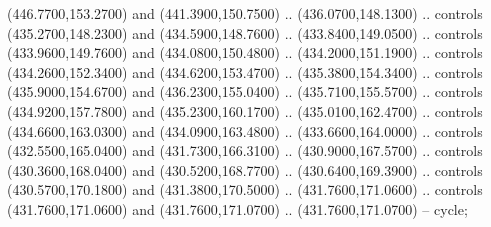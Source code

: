{\begin{scope}[y=0.80pt, x=0.80pt, yscale=-1, xscale=1, inner sep=0pt, outer sep=0pt, #1]
      (446.7700,153.2700) and (441.3900,150.7500) .. (436.0700,148.1300) .. controls
      (435.2700,148.2300) and (434.5900,148.7600) .. (433.8400,149.0500) .. controls
      (433.9600,149.7600) and (434.0800,150.4800) .. (434.2000,151.1900) .. controls
      (434.2600,152.3400) and (434.6200,153.4700) .. (435.3800,154.3400) .. controls
      (435.9000,154.6700) and (436.2300,155.0400) .. (435.7100,155.5700) .. controls
      (434.9200,157.7800) and (435.2300,160.1700) .. (435.0100,162.4700) .. controls
      (434.6600,163.0300) and (434.0900,163.4800) .. (433.6600,164.0000) .. controls
      (432.5500,165.0400) and (431.7300,166.3100) .. (430.9000,167.5700) .. controls
      (430.3600,168.0400) and (430.5200,168.7700) .. (430.6400,169.3900) .. controls
      (430.5700,170.1800) and (431.3800,170.5000) .. (431.7600,171.0600) .. controls
      (431.7600,171.0600) and (431.7600,171.0700) .. (431.7600,171.0700) -- cycle;


\end{scope}}
